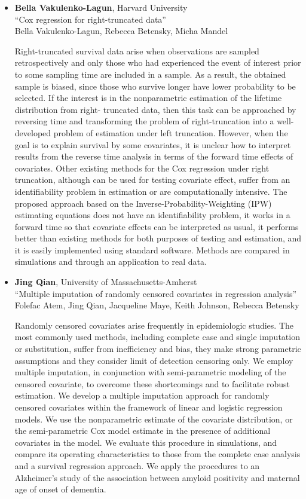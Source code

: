 \begin{itemize}
\item \textbf{Bella Vakulenko-Lagun}, Harvard University \\
``Cox regression for right-truncated data'' \\
Bella Vakulenko-Lagun, Rebecca Betensky, Micha Mandel


Right-truncated survival data arise when observations are sampled retrospectively and
only those who had experienced the event of interest prior to some sampling time are
included in a sample. As a result, the obtained sample is biased, since those who survive
longer have lower probability to be selected.
If the interest is in the nonparametric estimation of the lifetime distribution from right-
truncated data, then this task can be approached by reversing time and transforming the
problem of right-truncation into a well-developed problem of estimation under left truncation. However, when the goal is to explain survival by some covariates, it is unclear how
to interpret results from the reverse time analysis in terms of the forward time effects of
covariates. Other existing methods for the Cox regression under right truncation, although
can be used for testing covariate effect, suffer from an identifiability problem in estimation
or are computationally intensive.
The proposed approach based on the Inverse-Probability-Weighting (IPW) estimating
equations does not have an identifiability problem, it works in a forward time so that covariate effects can be interpreted as usual, it performs better than existing methods for both purposes of testing and estimation, and it is easily implemented using standard software.
Methods are compared in simulations and through an application to real data.

\item \textbf{Jing Qian}, University of Massachusetts-Amherst \\
``Multiple imputation of randomly censored covariates in regression analysis'' \\
Folefac Atem, Jing Qian, Jacqueline Maye, Keith Johnson, Rebecca Betensky


Randomly censored covariates arise frequently in epidemiologic studies. The most commonly used  methods, including complete case and single imputation or substitution, suffer from inefficiency and bias, they make strong parametric assumptions and they consider limit of detection censoring only.  We employ multiple imputation, in conjunction with semi-parametric modeling of the censored covariate, to overcome these shortcomings and to facilitate robust estimation. We develop a multiple imputation approach for randomly censored covariates within the framework of linear and logistic regression models.  We use the nonparametric estimate of the covariate distribution, or the semi-parametric Cox model estimate in the presence of additional covariates in the model.  We evaluate this procedure in simulations, and compare its operating characteristics to those from the complete case analysis and a survival regression approach.  We apply the procedures to an Alzheimer’s study of the association between amyloid positivity and maternal age of onset of dementia.

\end{itemize}

